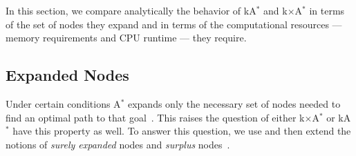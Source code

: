 \documentclass[smallextended]{svjour3}       %
\newcommand{\spp}{\ac{SPP}\xspace}
\newcommand{\astar}{A$^*$\xspace}
\newcommand{\kastar}{kA$^*$\xspace}
\newcommand{\kxastar}{k$\times$A$^*$\xspace}
\newcommand{\tuple}[1]{\ensuremath{\left \langle #1 \right \rangle }}
\newcommand{\roni}[1]{\textbf{[RS:#1]}}
\newcommand{\abda}[1]{\textbf{[AS:#1]}}
\begin{document}
In this section, we compare analytically the behavior of \kastar and \kxastar in terms of the set of nodes they expand and in terms of the computational resources --- memory requirements and CPU runtime --- they require. 

\subsection{Expanded Nodes}

Under certain conditions \astar expands only the necessary set of nodes needed to find an optimal path to that goal~\cite{dechter1985generalizedBestFirst}. This raises the question of either \kxastar or \kastar have this property as well. To answer this question, we use and then extend the notions of \emph{surely expanded} nodes and \emph{surplus} nodes~\cite{dechter1985generalizedBestFirst,goldenberg2014enhanced}.



  
\end{document}
